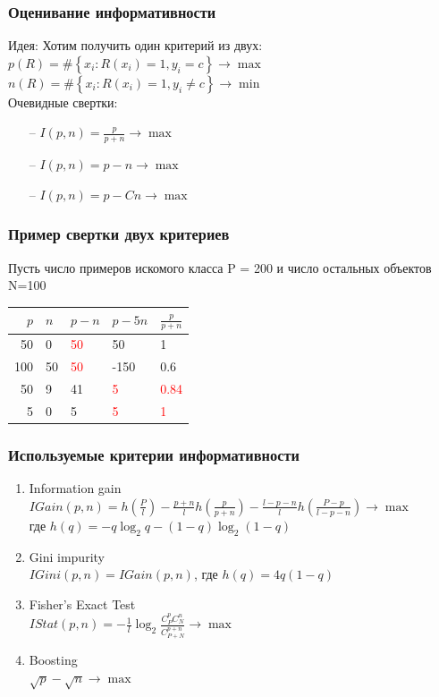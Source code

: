 \documentclass[12pt]{beamer}
\begin{document}
\begin{frame}\frametitle{Оценивание информативности}
Идея: Хотим получить один критерий из двух:\\
\vspace{5mm}
${ p(R) = \# \left\{ x_i: R(x_i) = 1 , y_i = c \right\} \rightarrow \max  }$ 
${ n(R) = \# \left\{ x_i: R(x_i) = 1 , y_i \neq c \right\} \rightarrow \min}$ \\
\vspace{5mm}
	Очевидные свертки:\\
	\begin{itemize}
		\item[--] $I(p, n) = \frac{p}{p+n} \rightarrow \max$
		\item[--] $I(p, n) = p-n \rightarrow \max$
		\item[--] $I(p, n) = p-Cn \rightarrow \max$			
	\end{itemize}
\end{frame}

\begin{frame}\frametitle{Пример свертки двух критериев}
Пусть число примеров искомого класса P = 200 и число остальных объектов N=100\\
\vspace{5mm}
\begin{tabular}{|r l|l|l|l|}
  \hline 
  $p$ & $n$ & $p-n$ & $p-5n$ & $\frac{p}{p+n}$\\ 
  \hline \hline
  50 & 0 & \textcolor{red}{50} & 50 & 1\\
  \hline
  100 & 50 & \textcolor{red}{50} & -150 & 0.6\\
  \hline \hline
  50 & 9 & 41 & \textcolor{red}{5} & \textcolor{red}{0.84}\\
  \hline  
  5 & 0 & 5 & \textcolor{red}{5} & \textcolor{red}{1}\\  
  \hline 
\end{tabular}
\end{frame}

\begin{frame}\frametitle{Используемые критерии информативности}
\begin{enumerate}[--]
\item Information gain
$IGain(p,n) = h(\frac{P}{l}) - \frac{p+n}{l}h(\frac{p}{p+n}) - \frac{l-p-n}{l}h(\frac{P-p}{l-p-n}) \rightarrow \max$\\
где $h(q) = -q\log_2q - (1-q)\log_2(1-q)$
\item Gini impurity\\
$IGini(p,n)=IGain(p,n)$, где $h(q)=4q(1-q)$
\item Fisher’s Exact Test\\
$IStat(p,n) = -\frac{1}{l}\log_2\frac{C_P^pC_N^n}{C_{P+N}^{p+n}} \rightarrow \max$
\item Boosting\\
$\sqrt{p} - \sqrt{n} \rightarrow \max$
\end{enumerate}

\end{frame}
\end{document}
